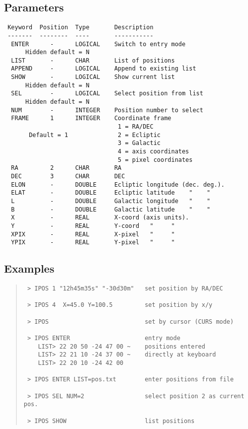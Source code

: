 \documentclass{book}
\renewcommand{\_}{{\tt\char'137}}     %
\begin{document}
\subsection{Parameters}
\begin{verbatim}
 Keyword  Position  Type       Description
 -------  --------  ----       -----------
  ENTER      -      LOGICAL    Switch to entry mode
      Hidden default = N
  LIST       -      CHAR       List of positions
  APPEND     -      LOGICAL    Append to existing list
  SHOW       -      LOGICAL    Show current list
      Hidden default = N
  SEL        -      LOGICAL    Select position from list
      Hidden default = N
  NUM        -      INTEGER    Position number to select
  FRAME      1      INTEGER    Coordinate frame
                                1 = RA/DEC
       Default = 1              2 = Ecliptic
                                3 = Galactic
                                4 = axis coordinates
                                5 = pixel coordinates
  RA         2      CHAR       RA
  DEC        3      CHAR       DEC
  ELON       -      DOUBLE     Ecliptic longitude (dec. deg.).
  ELAT       -      DOUBLE     Ecliptic latitude    "    "
  L          -      DOUBLE     Galactic longitude   "    "
  B          -      DOUBLE     Galactic latitude    "    "
  X          -      REAL       X-coord (axis units).
  Y          -      REAL       Y-coord   "     "
  XPIX       -      REAL       X-pixel   "     "
  YPIX       -      REAL       Y-pixel   "     "

\end{verbatim}\subsection{Examples}
\begin{quote}\begin{verbatim}
 > IPOS 1 "12h45m35s" "-30d30m"   set position by RA/DEC

 > IPOS 4  X=45.0 Y=100.5         set position by x/y

 > IPOS                           set by cursor (CURS mode)

 > IPOS ENTER                     entry mode
    LIST> 22 20 50 -24 47 00 ~    positions entered
    LIST> 22 21 10 -24 37 00 ~    directly at keyboard
    LIST> 22 20 10 -24 42 00

 > IPOS ENTER LIST=pos.txt        enter positions from file

 > IPOS SEL NUM=2                 select position 2 as current pos.

 > IPOS SHOW                      list positions
\end{verbatim}\end{quote}
\end{document}
